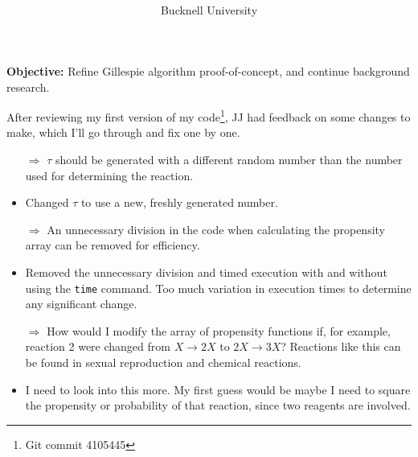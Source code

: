 \documentclass[oneside]{labbook}
\newcommand{\obj}[1]{\textbf{Objective:} #1}
\begin{document}
\title{
}

\author{
  \\ \\
  Bucknell University
}

\date{}

\maketitle

\printindex
\tableofcontents

\pagestyle{scrheadings}


\obj{Refine Gillespie algorithm proof-of-concept, and continue background research.}

After reviewing my first version of my code\footnote{Git commit 4105445}, JJ had
feedback on some changes to make, which I'll go through and fix one by one.

\begin{itemize}
  \item[$\Rightarrow$] $\tau$ should be generated with a different random number than the number used
  for determining the reaction.
  \item Changed $\tau$ to use a new, freshly generated number.

  \item[$\Rightarrow$] An unnecessary division in the code when calculating the
  propensity array can be removed for efficiency.
  \item Removed the unnecessary division and timed execution with and without
  using the \texttt{time} command. Too much variation in execution times to determine
  any significant change.

  \item[$\Rightarrow$] How would I modify the array of propensity functions if,
  for example, reaction 2 were changed from $X \rightarrow 2X$ to $2X \rightarrow 3X$?
  Reactions like this can be found in sexual reproduction and chemical reactions.
  \item I need to look into this more. My first guess would be maybe I need to
  square the propensity or probability of that reaction, since two reagents are involved.
\end{itemize}
\end{document}
